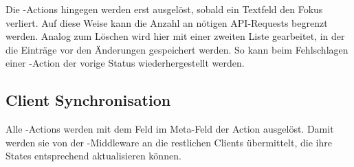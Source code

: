Die -Actions hingegen werden erst ausgelöst, sobald ein Textfeld
den Fokus verliert.  Auf diese Weise kann die Anzahl an nötigen API-Requests
begrenzt werden.  Analog zum Löschen wird hier mit einer zweiten Liste
gearbeitet, in der die Einträge vor den Änderungen gespeichert werden.  So kann
beim Fehlschlagen einer -Action der vorige
Status wiederhergestellt werden.

\subsection{Client Synchronisation}
\label{ssec:fc_client_synchronisation}

Alle -Actions werden mit dem Feld  im
Meta-Feld der Action ausgelöst.  Damit werden sie von der
-Middleware an die restlichen Clients übermittelt, die ihre
States entsprechend aktualisieren können.
